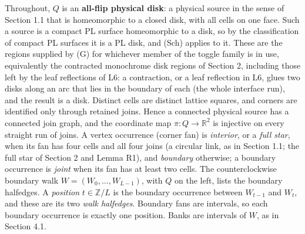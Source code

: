 \documentclass[
  11pt,
]{article}
\begin{document}
Throughout, \(Q\) is an \textbf{all-flip physical disk}: a physical
source in the sense of Section 1.1 that is homeomorphic to a closed
disk, with all cells on one face. Such a source is a compact PL surface
homeomorphic to a disk, so by the classification of compact PL surfaces
it is a PL disk, and (Sch) applies to it. These are the regions supplied
by (G) for whichever member of the toggle family is in use, equivalently
the contracted monochrome disk regions of Section 2, including those
left by the leaf reflections of L6: a contraction, or a leaf reflection
in L6, glues two disks along an arc that lies in the boundary of each
(the whole interface run), and the result is a disk. Distinct cells are
distinct lattice squares, and corners are identified only through
retained joins. Hence a connected physical source has a connected join
graph, and the coordinate map \(\pi:Q\to\mathbb R^2\) is injective on
every straight run of joins. A vertex occurrence (corner fan) is
\emph{interior}, or a \emph{full star}, when its fan has four cells and
all four joins (a circular link, as in Section 1.1; the full star of
Section 2 and Lemma R1), and \emph{boundary} otherwise; a boundary
occurrence is \emph{joint} when its fan has at least two cells. The
counterclockwise boundary walk \(W=(W_0,\ldots,W_{L-1})\), with \(Q\) on
the left, lists the boundary halfedges. A \emph{position}
\(t\in\mathbb Z/L\) is the boundary occurrence between \(W_{t-1}\) and
\(W_t\), and these are its two \emph{walk halfedges}. Boundary fans are
intervals, so each boundary occurrence is exactly one position. Banks
are intervals of \(W\), as in Section 4.1.
\end{document}
